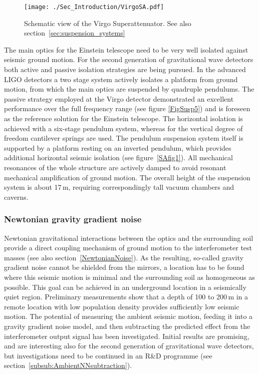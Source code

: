 \begin{wrapfigure}{r}{0.4\textwidth}
\vskip -0.4cm
	\centering
		\texttt{[image: ./Sec\_Introduction/VirgoSA.pdf]}
\vskip 0.3cm
	\caption{Schematic view of the Virgo Superattenuator. See also section~\ref{sec:suspension_systems}}
\vskip -0.6cm
\end{wrapfigure} 

The main optics for the Einstein telescope need to be very well isolated against 
seismic ground motion. For the second generation of gravitational wave detectors 
both active and passive isolation strategies are being pursued. In the advanced 
LIGO detectors a two stage system actively isolates a platform from ground 
motion, from which the main optics are suspended by quadruple pendulums. The 
passive strategy employed at the Virgo detector demonstrated an excellent 
performance over the full frequency range (see figure \ref{FigSusp5}) and is foreseen 
as the reference solution for the Einstein telescope. The horizontal isolation is 
achieved with a six-stage pendulum system, whereas for the vertical degree of 
freedom cantilever springs  are used. The pendulum suspension system itself is 
supported by a platform resting on an inverted pendulum, which provides 
additional horizontal seismic isolation (see figure~\ref{SAfig1}). All mechanical 
resonances of the whole structure are actively damped to avoid resonant 
mechanical amplification of ground motion. The overall height of the suspension 
system is about 17\,m, requiring correspondingly tall vacuum chambers and caverns.

\subsubsection{Newtonian gravity gradient noise}
Newtonian gravitational interactions between the optics and the surrounding soil 
provide a direct coupling mechanism of ground motion to the interferometer test 
masses (see also section~\ref{NewtonianNoise}). As the resulting, so-called 
gravity gradient noise cannot be shielded from the mirrors, a location has to be 
found where this seismic motion is minimal and the surrounding soil as 
homogeneous as possible. This goal can be achieved in an underground location 
in a seismically quiet region. Preliminary measurements show that a depth of 100 to 
200\,m in a remote location with low population density provides sufficiently low 
seismic motion. The potential of measuring the ambient seismic motion, feeding 
it into a gravity gradient noise model, and then subtracting the predicted effect 
from the interferometer output signal has been investigated. Initial results are 
promising, and are interesting also for the second generation of gravitational 
wave detectors, but investigations need to be continued in an R\&D programme 
(see section~\ref{subsub:AmbientNNsubtraction}).


